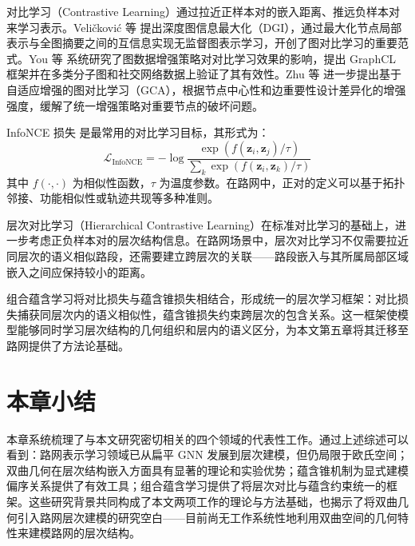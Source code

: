 对比学习（Contrastive Learning）通过拉近正样本对的嵌入距离、推远负样本对来学习表示。Veličković 等\cite{velickovic2019dgi} 提出深度图信息最大化（DGI），通过最大化节点局部表示与全图摘要之间的互信息实现无监督图表示学习，开创了图对比学习的重要范式。You 等\cite{you2020graphcl} 系统研究了图数据增强策略对对比学习效果的影响，提出 GraphCL 框架并在多类分子图和社交网络数据上验证了其有效性。Zhu 等\cite{zhu2021gca} 进一步提出基于自适应增强的图对比学习（GCA），根据节点中心性和边重要性设计差异化的增强强度，缓解了统一增强策略对重要节点的破坏问题。

InfoNCE 损失\cite{oord2018infonce} 是最常用的对比学习目标，其形式为：
\begin{equation}
    \mathcal{L}_{\text{InfoNCE}} = -\log \frac{\exp(f(\mathbf{z}_i, \mathbf{z}_j)/\tau)}{\sum_{k} \exp(f(\mathbf{z}_i, \mathbf{z}_k)/\tau)}
\end{equation}
其中 $f(\cdot, \cdot)$ 为相似性函数，$\tau$ 为温度参数。在路网中，正对的定义可以基于拓扑邻接、功能相似性或轨迹共现等多种准则。


层次对比学习（Hierarchical Contrastive Learning）在标准对比学习的基础上，进一步考虑正负样本对的层次结构信息。在路网场景中，层次对比学习不仅需要拉近同层次的语义相似路段，还需要建立跨层次的关联——路段嵌入与其所属局部区域嵌入之间应保持较小的距离。

组合蕴含学习将对比损失与蕴含锥损失相结合，形成统一的层次学习框架：对比损失捕获同层次内的语义相似性，蕴含锥损失约束跨层次的包含关系。这一框架使模型能够同时学习层次结构的几何组织和层内的语义区分，为本文第五章将其迁移至路网提供了方法论基础。

\section{本章小结}

本章系统梳理了与本文研究密切相关的四个领域的代表性工作。通过上述综述可以看到：路网表示学习领域已从扁平 GNN 发展到层次建模，但仍局限于欧氏空间；双曲几何在层次结构嵌入方面具有显著的理论和实验优势；蕴含锥机制为显式建模偏序关系提供了有效工具；组合蕴含学习提供了将层次对比与蕴含约束统一的框架。这些研究背景共同构成了本文两项工作的理论与方法基础，也揭示了将双曲几何引入路网层次建模的研究空白——目前尚无工作系统性地利用双曲空间的几何特性来建模路网的层次结构。